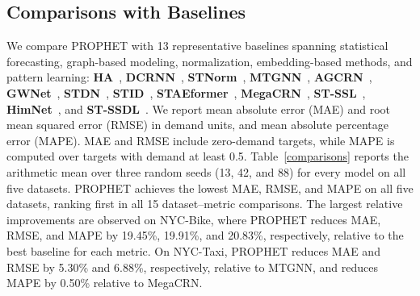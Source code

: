 \subsection{Comparisons with Baselines}
We compare PROPHET with 13 representative baselines spanning statistical forecasting, graph-based modeling, normalization, embedding-based methods, and pattern learning:
\textbf{HA}~\cite{ha}, \textbf{DCRNN}~\cite{dcrnn}, \textbf{STNorm}~\cite{stnorm}, \textbf{MTGNN}~\cite{mtgnn}, \textbf{AGCRN}~\cite{agcrn}, \textbf{GWNet}~\cite{gwnet}, \textbf{STDN}~\cite{stdn}, \textbf{STID}~\cite{stid}, \textbf{STAEformer}~\cite{staeformer}, \textbf{MegaCRN}~\cite{megacrn}, \textbf{ST-SSL}~\cite{stssl}, \textbf{HimNet}~\cite{himnet}, and \textbf{ST-SSDL}~\cite{stssdl}.
We report mean absolute error (MAE) and root mean squared error (RMSE) in demand units, and mean absolute percentage error (MAPE). MAE and RMSE include zero-demand targets, while MAPE is computed over targets with demand at least 0.5.
Table~\ref{comparisons} reports the arithmetic mean over three random seeds (13, 42, and 88) for every model on all five datasets.
PROPHET achieves the lowest MAE, RMSE, and MAPE on all five datasets, ranking first in all 15 dataset--metric comparisons.
The largest relative improvements are observed on NYC-Bike, where PROPHET reduces MAE, RMSE, and MAPE by 19.45\%, 19.91\%, and 20.83\%, respectively, relative to the best baseline for each metric.
On NYC-Taxi, PROPHET reduces MAE and RMSE by 5.30\% and 6.88\%, respectively, relative to MTGNN, and reduces MAPE by 0.50\% relative to MegaCRN.

